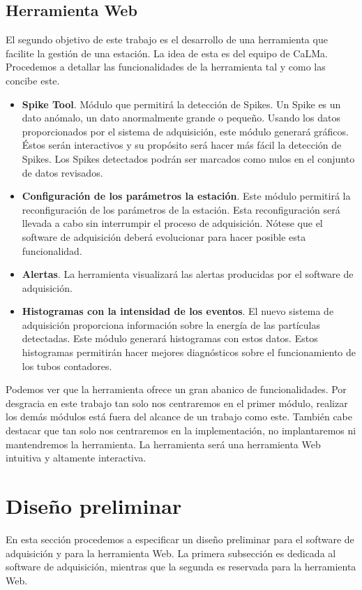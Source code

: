 	\subsection{Herramienta Web}
		El segundo objetivo de este trabajo es el desarrollo de una herramienta que facilite la gestión de una estación. La idea de esta
		es del equipo de CaLMa. Procedemos a detallar las funcionalidades de la herramienta tal y como las concibe este.
		\begin{itemize}
			\item	\textbf{Spike Tool}. Módulo que permitirá la detección de Spikes. Un Spike es un dato anómalo, un dato
				anormalmente grande o pequeño. Usando los datos proporcionados por el sistema de adquisición, este módulo generará
				gráficos. Éstos serán interactivos y su propósito será hacer más fácil la detección de Spikes. Los Spikes detectados
				podrán ser marcados como nulos en el conjunto de datos revisados. 
			\item 	\textbf{Configuración de los parámetros la estación}. Este módulo permitirá la reconfiguración de los parámetros de la
				estación. Esta reconfiguración será llevada a cabo sin interrumpir el proceso de adquisición. Nótese que el software
				de adquisición deberá evolucionar para hacer posible esta funcionalidad.
			\item	\textbf{Alertas}. La herramienta visualizará las alertas producidas por el software de adquisición.
			\item 	\textbf{Histogramas con la intensidad de los eventos}. El nuevo sistema de adquisición proporciona información sobre
				la energía de las partículas detectadas. Este módulo generará histogramas con estos datos. Estos histogramas
				permitirán hacer mejores diagnósticos sobre el funcionamiento de los tubos contadores. 
		\end{itemize}
		Podemos ver que la herramienta ofrece un gran abanico de funcionalidades. Por desgracia en este trabajo tan solo nos centraremos en el
		primer módulo, realizar los demás módulos está fuera del alcance de un trabajo como este. También cabe destacar que tan solo nos
		centraremos en la implementación, no implantaremos ni mantendremos la herramienta. La herramienta será una herramienta Web intuitiva y
		altamente interactiva.

\section{Diseño preliminar}
	En esta sección procedemos a especificar un diseño preliminar para el software de adquisición y para la herramienta Web. La primera subsección
	es dedicada al software de adquisición, mientras que la segunda es reservada para la herramienta Web.
